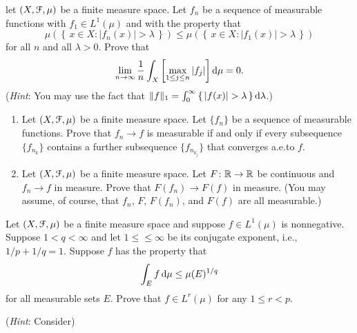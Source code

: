 \begin{problem}
let $(X,\mathcal{F},\mu)$ be a finite measure space. Let $f_n$ be a sequence of
measurable functions with $f_1\in L^1(\mu)$ and with the property that
\[
\mu\left(\left\{\,x\in X:|f_n(x)|>\lambda\,\right\}\right)
\leq
\mu\left(\left\{\,x\in X:|f_1(x)|>\lambda\,\right\}\right)
\]
for all $n$ and all $\lambda>0$. Prove that
\[
\lim_{n\to\infty}\frac{1}{n}\int_X\left[\max_{1\leq j\leq n}|f_j|\right]\mathop{}\!\mathrm{d}\mu=0.
\]
(\emph{Hint}: You may use the fact that
$\|f\|_1=\int_0^\infty\left\{\,|f(x)|>\lambda\,\right\}\diff\lambda$.)
\end{problem}
\begin{solution}
\end{solution}

\begin{problem}
\begin{enumerate}[label=(\roman*)]
\item Let $(X,\mathcal{F},\mu)$ be a finite measure space. Let $\{f_n\}$ be a sequence
of measurable functions. Prove that $f_n\to f$ is measurable if and only if
every subsequence $\{f_{n_k}\}$ contains a further subsequence
$\{f_{n_{k_j}}\}$ that converges a.e.\@ to $f$.
\item Let $(X,\mathcal{F},\mu)$ be a finite measure space. Let
$F\colon\mathbb{R}\to\mathbb{R}$ be continuous and $f_n\to f$ in measure. Prove that
$F(f_n)\to F(f)$ in measure. (You may assume, of course, that $f_n$, $F$,
$F(f_n)$, and $F(f)$ are all measurable.)
\end{enumerate}
\end{problem}
\begin{solution}
\end{solution}

\begin{problem}
Let $(X,\mathcal{F},\mu)$ be a finite measure space and suppose $f\in L^1(\mu)$
is nonnegative. Suppose $1<q<\infty$ and let $1\leq \leq\infty$ be its
conjugate exponent, i.e., $1/p+1/q=1$. Suppose $f$ has the property that
\[
\int_Ef\mathop{}\!\mathrm{d}\mu\leq \mu(E)^{1/q}
\]
for all measurable sets $E$. Prove that $f\in L^r(\mu)$ for any $1\leq
r<p$.

(\emph{Hint}: Consider)
\end{problem}
\begin{solution}
\end{solution}

